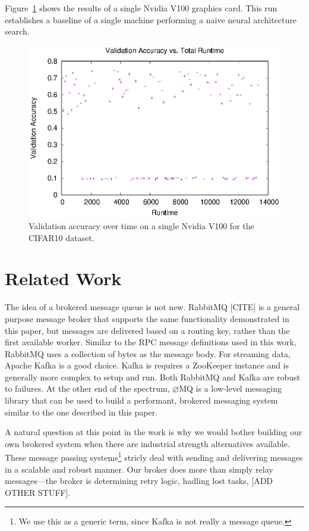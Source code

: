 \documentclass[conference]{IEEEtran}
\begin{document}
Figure~\ref{fig:single-val} shows the results of a single Nvidia V100
graphics card. This run establishes a baseline of a single machine
performing a naive neural architecture search.

\begin{figure}
  \centering
  \includegraphics[width=\columnwidth]{result/output/single_worker}
  \caption{Validation accuracy over time on a single Nvidia V100 for
    the CIFAR10 dataset.}
  \label{fig:single-val}
\end{figure}
\section{Related Work}
The idea of a brokered message queue is not new. RabbitMQ [CITE] is a general
purpose message broker that supports the same functionality demonstrated
in this paper, but messages are delivered based on a routing key, rather than
the first available worker. Similar to the RPC message definitions used in
this work, RabbitMQ uses a collection of bytes as the message body. For
streaming data, Apache Kafka \cite{kafka} is a good choice. Kafka is requires a
ZooKeeper \cite{Hunt:2010:ZWC:1855840.1855851} instance and is generally
more complex to setup and run.
Both RabbitMQ and Kafka are robust to failures. At the other end of the
spectrum, $\varnothing$MQ is a low-level messaging library that can be used
to build a performant, brokered messaging system similar to the one described
in this paper.

A natural question at this point in the work is why we would bother building our
own brokered system when there are industrial strength alternatives
available. These message passing systems\footnote{We use this as a generic term,
  since Kafka is not really a message queue.} stricly deal with sending and
delivering messages in a scalable and robust manner. Our broker does more than
simply relay messages---the broker is determining retry logic, hadling lost
tasks, [ADD OTHER STUFF].
\end{document}

